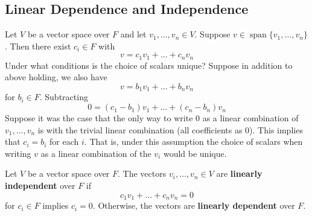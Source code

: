 \documentclass{article}
\DeclareMathOperator{\spn}{span}
\begin{document}
\subsection{Linear Dependence and Independence}
\begin{remark}
  Let $V$ be a vector space over $F$ and let $v_1, \ldots, v_n \in V$. Suppose $v \in \spn\{v_1, \ldots, v_n\}$. Then there exist $c_i \in F$ with
  \[
    v = c_1v_1 + \dots + c_nv_n
  \]
  Under what conditions is the choice of scalars unique?
  Suppose in addition to above holding, we also have
  \[
    v = b_1v_1 + \dots + b_nv_n
  \]
  for $b_i \in F$. Subtracting
  \[
    0 = (c_1 - b_1)v_1 + \dots + (c_n - b_n)v_n
  \]
  Suppose it was the case that the only way to write $0$ as a linear combination of $v_1, \ldots, v_n$ is with the trivial linear combination (all coefficients as 0). This implies that $c_i = b_i$ for each $i$. That is, under this assumption the choice of scalars when writing $v$ as a linear combination of the $v_i$ would be unique.
\end{remark}
\begin{definition}
  Let $V$ be a vector space over $F$. The vectors $v_i, \ldots, v_n \in V$ are \textbf{linearly independent} over $F$ if
  \[
    c_1v_1 + \dots + c_nv_n = 0
  \]
  for $c_i \in F$ implies $c_i = 0$. Otherwise, the vectors are \textbf{linearly dependent} over $F$.
\end{definition}
\end{document}
